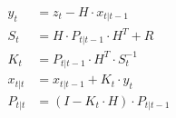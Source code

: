 \begin{align*}
    y_t &= z_t - H \cdot x_{t|t-1}\\
    S_t &= H \cdot P_{t|t-1} \cdot H^T + R\\
    K_t &= P_{t|t-1} \cdot H^T \cdot S_t^{-1}\\
    x_{t|t} &= x_{t|t-1} + K_t \cdot y_t\\
    P_{t|t} &= (I - K_t \cdot H) \cdot P_{t|t-1}\\
\end{align*}
